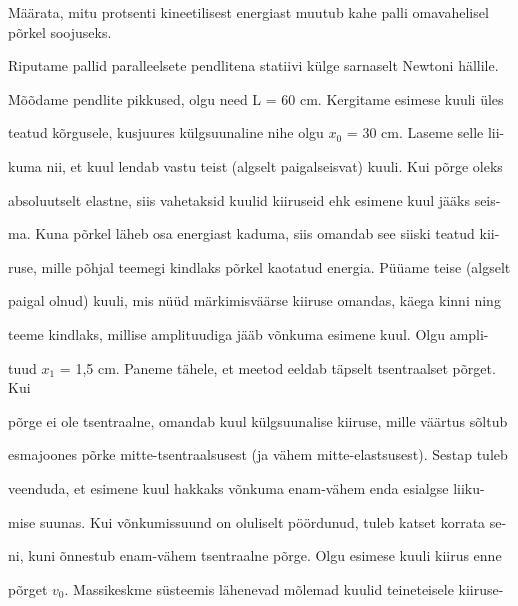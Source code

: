 
Määrata, mitu protsenti kineetilisest energiast muutub kahe palli omavahelisel põrkel soojuseks.

\hint

\solu
Riputame pallid paralleelsete pendlitena statiivi külge sarnaselt Newtoni hällile.

Mõõdame pendlite pikkused, olgu need L = 60 cm. Kergitame esimese kuuli üles

teatud kõrgusele, kusjuures külgsuunaline nihe olgu $x_0$ = 30 cm. Laseme selle lii-

kuma nii, et kuul lendab vastu teist (algselt paigalseisvat) kuuli. Kui põrge oleks

absoluutselt elastne, siis vahetaksid kuulid kiiruseid ehk esimene kuul jääks seis-

ma. Kuna põrkel läheb osa energiast kaduma, siis omandab see siiski teatud kii-

ruse, mille põhjal teemegi kindlaks põrkel kaotatud energia. Püüame teise (algselt

paigal olnud) kuuli, mis nüüd märkimisväärse kiiruse omandas, käega kinni ning

teeme kindlaks, millise amplituudiga jääb võnkuma esimene kuul. Olgu ampli-

tuud $x_1$ = 1,5 cm. Paneme tähele, et meetod eeldab täpselt tsentraalset põrget. Kui

põrge ei ole tsentraalne, omandab kuul külgsuunalise kiiruse, mille väärtus sõltub

esmajoones põrke mitte-tsentraalsusest (ja vähem mitte-elastsusest). Sestap tuleb

veenduda, et esimene kuul hakkaks võnkuma enam-vähem enda esialgse liiku-

mise suunas. Kui võnkumissuund on oluliselt pöördunud, tuleb katset korrata se-

ni, kuni õnnestub enam-vähem tsentraalne põrge. Olgu esimese kuuli kiirus enne

põrget $v_0$. Massikeskme süsteemis lähenevad mõlemad kuulid teineteisele kiiruse-

